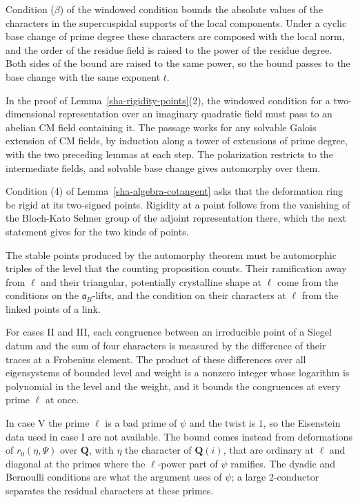 Condition ($\beta$) of the windowed condition bounds the absolute values of the characters in the supercuspidal supports of the local components. Under a cyclic base change of prime degree these characters are composed with the local norm, and the order of the residue field is raised to the power of the residue degree. Both sides of the bound are raised to the same power, so the bound passes to the base change with the same exponent $t$.

In the proof of Lemma~\ref{sha-rigidity-points}(2), the windowed condition for a two-dimensional representation over an imaginary quadratic field must pass to an abelian CM field containing it. The passage works for any solvable Galois extension of CM fields, by induction along a tower of extensions of prime degree, with the two preceding lemmas at each step. The polarization restricts to the intermediate fields, and solvable base change gives automorphy over them.

Condition (4) of Lemma~\ref{sha-algebra-cotangent} asks that the deformation ring be rigid at its two-signed points. Rigidity at a point follows from the vanishing of the Bloch-Kato Selmer group of the adjoint representation there, which the next statement gives for the two kinds of points.

The stable points produced by the automorphy theorem must be automorphic triples of the level that the counting proposition counts. Their ramification away from $\ell$ and their triangular, potentially crystalline shape at $\ell$ come from the conditions on the $\mathfrak a_B$-lifts, and the condition on their characters at $\ell$ from the linked points of a link.

For cases II and III, each congruence between an irreducible point of a Siegel datum and the sum of four characters is measured by the difference of their traces at a Frobenius element. The product of these differences over all eigensystems of bounded level and weight is a nonzero integer whose logarithm is polynomial in the level and the weight, and it bounds the congruences at every prime $\ell$ at once.

In case V the prime $\ell$ is a bad prime of $\psi$ and the twist is $1$, so the Eisenstein data used in case I are not available. The bound comes instead from deformations of $r_0(\eta,\Psi)$ over $\mathbf Q$, with $\eta$ the character of $\mathbf Q(i)$, that are ordinary at $\ell$ and diagonal at the primes where the $\ell$-power part of $\psi$ ramifies. The dyadic and Bernoulli conditions are what the argument uses of $\psi$; a large $2$-conductor separates the residual characters at these primes.

